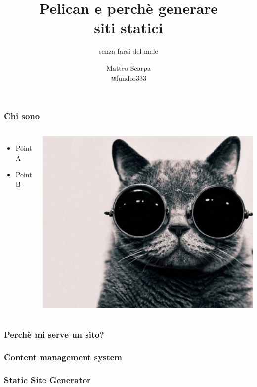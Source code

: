 
\title{Pelican e perchè generare\\ siti statici}
\subtitle{senza farsi del male}
\author{Matteo Scarpa \\ @fundor333}


	\frame{\maketitle}
	
	\begin{frame}
	\frametitle{Chi sono}
		\begin{columns}
			\begin{itemize}
				\item Point A
				\item Point B
			\end{itemize}
			\includegraphics[scale=0.1]{cat-in-glasses}
		\end{columns}	
	\end{frame}


	\begin{frame}
		\frametitle{Perchè mi serve un sito?}
	\end{frame}

	\begin{frame}
		\frametitle{Content management system}
	\end{frame}
	
	\begin{frame}
		\frametitle{Static Site Generator}
	\end{frame}


